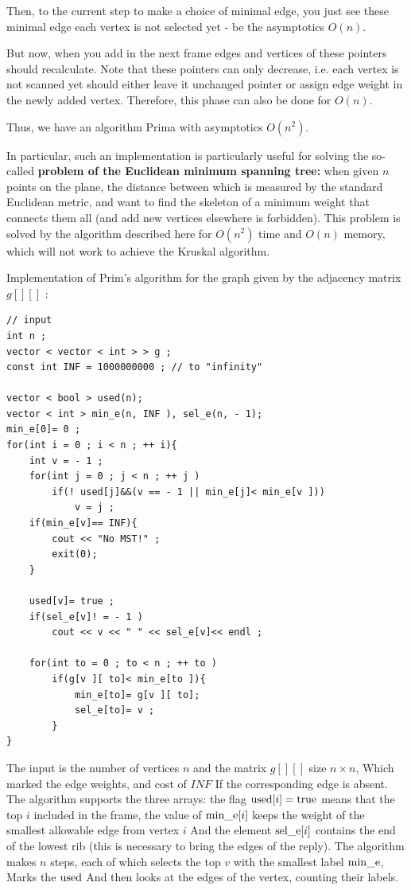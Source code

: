 Then, to the current step to make a choice of minimal edge, you just see these minimal edge each vertex is not selected yet - be the asymptotics $O (n)$.

But now, when you add in the next frame edges and vertices of these pointers should recalculate. Note that these pointers can only decrease, i.e. each vertex is not scanned yet should either leave it unchanged pointer or assign edge weight in the newly added vertex. Therefore, this phase can also be done for $O (n)$.

Thus, we have an algorithm Prima with asymptotics $O (n ^ 2)$.

In particular, such an implementation is particularly useful for solving the so-called \textbf{problem of the Euclidean minimum spanning tree:} when given $n$ points on the plane, the distance between which is measured by the standard Euclidean metric, and want to find the skeleton of a minimum weight that connects them all (and add new vertices elsewhere is forbidden). This problem is solved by the algorithm described here for $O (n ^ 2)$ time and $O (n)$ memory, which will not work to achieve the Kruskal algorithm.

Implementation of Prim's algorithm for the graph given by the adjacency matrix $g [][]$ :

\begin{verbatim}
// input
int n ;
vector < vector < int > > g ;
const int INF = 1000000000 ; // to "infinity"
 
vector < bool > used(n);
vector < int > min_e(n, INF ), sel_e(n, - 1);
min_e[0]= 0 ;
for(int i = 0 ; i < n ; ++ i){
    int v = - 1 ;
    for(int j = 0 ; j < n ; ++ j )
        if(! used[j]&&(v == - 1 || min_e[j]< min_e[v ]))
            v = j ;
    if(min_e[v]== INF){
        cout << "No MST!" ;
        exit(0);
    }
 
    used[v]= true ;
    if(sel_e[v]! = - 1 )
        cout << v << " " << sel_e[v]<< endl ;
 
    for(int to = 0 ; to < n ; ++ to )
        if(g[v ][ to]< min_e[to ]){
            min_e[to]= g[v ][ to];
            sel_e[to]= v ;
        }
} 
\end{verbatim}
The input is the number of vertices $n$ and the matrix $g [][]$ size $n \times n$, Which marked the edge weights, and cost of $INF$ If the corresponding edge is absent. The algorithm supports the three arrays: the flag ${\rm used} [i] = {\rm true}$ means that the top $i$ included in the frame, the value of ${\rm min \_e} [i]$ keeps the weight of the smallest allowable edge from vertex $i$ And the element ${\rm sel \_e} [i]$ contains the end of the lowest rib (this is necessary to bring the edges of the reply). The algorithm makes $n$ steps, each of which selects the top $v$ with the smallest label ${\rm min \_e}$, Marks the $\rm used$ And then looks at the edges of the vertex, counting their labels.


